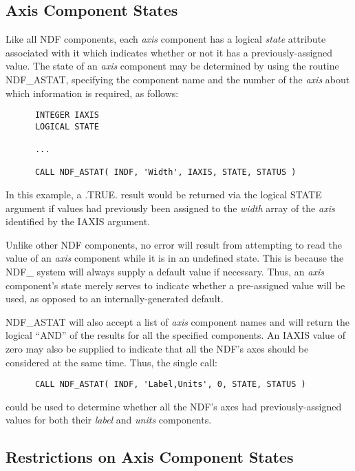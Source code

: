 \documentclass[twoside,11pt]{article}
\newcommand{\htmlref}[2]{#1}
\newcommand{\xlabel}[1]{}
\newcommand{\st}[1]{{\em{#1}}}
\begin{document}
\subsection{\xlabel{axis_component_states}Axis Component States}

Like all NDF components, each \st{axis\/} component has a logical
\st{state\/} attribute associated with it which indicates whether or
not it has 
a previously-assigned value. 
The state of an \st{axis\/} component may be determined by using the routine
\htmlref{NDF\_ASTAT}{NDF_ASTAT}, specifying the component name and the number of the \st{axis\/}
about which information is required, as follows: 

\small
\begin{verbatim}
      INTEGER IAXIS
      LOGICAL STATE

      ...

      CALL NDF_ASTAT( INDF, 'Width', IAXIS, STATE, STATUS )
\end{verbatim}
\normalsize

In this example, a .TRUE. result would be returned via the logical STATE
argument if values had previously been assigned to the \st{width\/} array
of the \st{axis\/} identified by the IAXIS argument. 

Unlike other NDF components, no error will result from attempting to read
the value of an \st{axis\/} component while it is in an undefined state.
This is because the NDF\_ system will always supply a default value if
necessary. 
Thus, an \st{axis\/} component's state merely serves to indicate whether a
pre-assigned value will be used, as opposed to an internally-generated
default. 

NDF\_ASTAT will also accept a list of \st{axis\/} component names and
will return the logical ``AND'' of the results for all the specified
components.  An IAXIS value of zero may also be supplied to indicate
that all the NDF's axes should be considered at the same time.  Thus,
the single call:

\small
\begin{verbatim}
      CALL NDF_ASTAT( INDF, 'Label,Units', 0, STATE, STATUS )
\end{verbatim}
\normalsize

could be used to determine whether all the NDF's axes had
previously-assigned values for both their \st{label\/} and \st{units\/}
components. 

\subsection{\xlabel{restrictions_on_axis_component_states}\label{ss:axisstate}Restrictions on Axis Component States}
\end{document}
